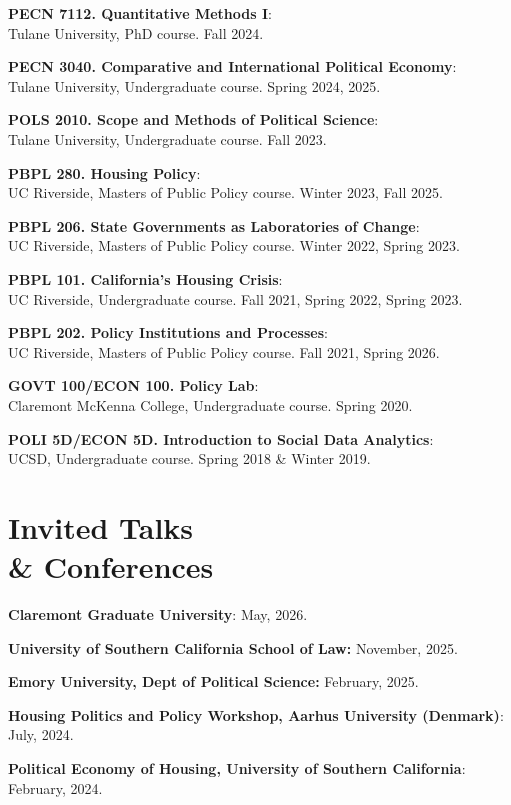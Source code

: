 \documentclass[margin,line]{res}
\begin{document}
\begin{resume}
{\bf PECN 7112. Quantitative Methods I}:\\ Tulane University, PhD course. Fall 2024. 

{\bf PECN 3040. Comparative and International Political Economy}:\\ Tulane University, Undergraduate course. Spring 2024, 2025.

{\bf POLS 2010. Scope and Methods of Political Science}:\\ Tulane University, Undergraduate course. Fall 2023. 

{\bf PBPL 280. Housing Policy}:\\ UC Riverside, Masters of Public Policy course. Winter 2023, Fall 2025.

{\bf PBPL 206. State Governments as Laboratories of Change}:\\ UC Riverside, Masters of Public Policy course. Winter 2022, Spring 2023. 

{\bf PBPL 101. California's Housing Crisis}:\\ UC Riverside, Undergraduate course. Fall 2021, Spring 2022, Spring 2023. 

{\bf PBPL 202. Policy Institutions and Processes}:\\ UC Riverside, Masters of Public Policy course. Fall 2021, Spring 2026.

{\bf GOVT 100/ECON 100. Policy Lab}:\\ Claremont McKenna College, Undergraduate course. Spring 2020. 

{\bf POLI 5D/ECON 5D. Introduction to Social Data Analytics}:\\ UCSD, Undergraduate course. Spring 2018 \& Winter 2019. 


\section{\sc Invited Talks\\ \& Conferences}

{\bf Claremont Graduate University}: May, 2026.

{\bf University of Southern California School of Law:} November, 2025.

{\bf Emory University, Dept of Political Science:} February, 2025.

{\bf Housing Politics and Policy Workshop, Aarhus University (Denmark)}: July, 2024.

{\bf Political Economy of Housing, University of Southern California}: February, 2024.


\end{resume}
\end{document}
